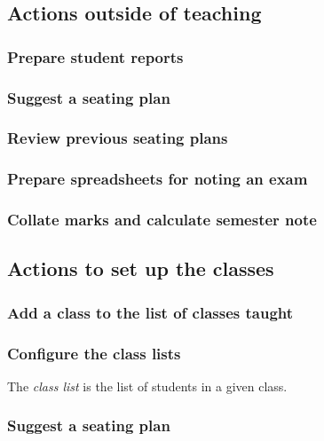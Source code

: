 \documentclass[10pt]{article}
\begin{document}
 
 
 
\subsection{Actions outside of teaching}
 
\subsubsection{Prepare student reports}

\subsubsection{Suggest a seating plan}

\subsubsection{Review previous seating plans}

\subsubsection{Prepare spreadsheets for noting an exam}

\subsubsection{Collate marks and calculate semester note}





\subsection{Actions to set up the classes}
 
\subsubsection{Add a class to the list of classes taught}

\subsubsection{Configure the class lists}
The \emph{class list} is the list of students in a given class.

\subsubsection{Suggest a seating plan}
\end{document}
